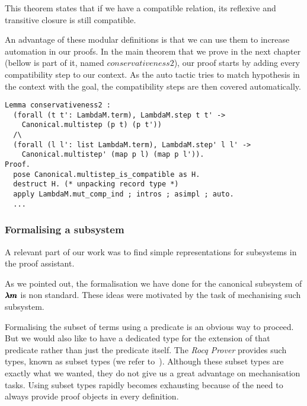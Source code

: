 This theorem states that if we have a compatible relation, its reflexive and transitive closure is still compatible.

An advantage of these modular definitions is that we can use them to increase automation in our proofs.
In the main theorem that we prove in the next chapter (bellow is part of it, named \lst$conservativeness2$), our proof starts by adding every compatibility step to our context.
As the auto tactic tries to match hypothesis in the context with the goal, the compatibility steps are then covered automatically.

\begin{lstlisting}[language=Coq]
Lemma conservativeness2 :
  (forall (t t': LambdaM.term), LambdaM.step t t' ->
    Canonical.multistep (p t) (p t'))
  /\
  (forall (l l': list LambdaM.term), LambdaM.step' l l' ->
    Canonical.multistep' (map p l) (map p l')).
Proof.
  pose Canonical.multistep_is_compatible as H.
  destruct H. (* unpacking record type *)
  apply LambdaM.mut_comp_ind ; intros ; asimpl ; auto.
  ...
\end{lstlisting}



\subsubsection{Formalising a subsystem}

A relevant part of our work was to find simple representations for subsystems in the proof assistant.

As we pointed out, the formalisation we have done for the canonical subsystem of $\pmb{\lambda m}$ is non standard.
These ideas were motivated by the task of mechanising such subsystem.

Formalising the subset of terms using a predicate is an obvious way to proceed.
But we would also like to have a dedicated type for the extension of that predicate rather than just the predicate itself.
The \textit{Rocq Prover} provides such types, known as subset types (we refer to~\cite[Chapter~9.1]{CoqArt}).
Although these subset types are exactly what we wanted, they do not give us a great advantage on mechanisation tasks.
Using subset types rapidly becomes exhausting because of the need to always provide proof objects in every definition.

